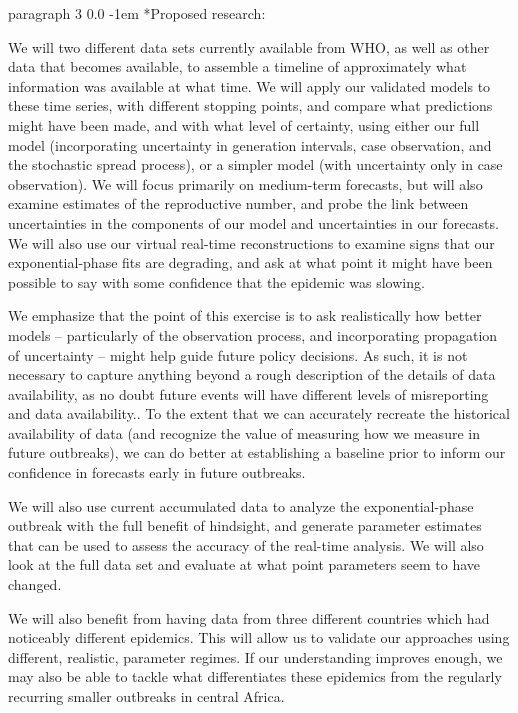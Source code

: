 \documentclass[12pt]{article}
\makeatletter
\renewcommand{\paragraph}{\vspace{0.40ex \@plus 0.2ex \@minus 0.0ex}\@startsection%
{paragraph}%
{3}%
{\parindent}%
{0.0\baselineskip}%
{-1em}%
{\normalfont\normalsize\bfseries}}%
\makeatother
\begin{document}
\paragraph*{Proposed research:}

We will two different data sets currently available from WHO, as well as other data that becomes available, to assemble a timeline of approximately what information was available at what time. We will apply our validated models to these time series, with different stopping points, and compare what predictions might have been made, and with what level of certainty, using either our full model (incorporating uncertainty in generation intervals, case observation, and the stochastic spread process), or a simpler model (with uncertainty only in case observation). We will focus primarily on medium-term forecasts, but will also examine estimates of the reproductive number, and probe the link between uncertainties in the components of our model and uncertainties in our forecasts. We will also use our virtual real-time reconstructions to examine signs that our exponential-phase fits are degrading, and ask at what point it might have been possible to say with some confidence that the epidemic was slowing.

We emphasize that the point of this exercise is to ask realistically how better models -- particularly of the observation process, and incorporating propagation of uncertainty -- might help guide future policy decisions.  As such, it is not  necessary to capture anything beyond a rough description of the details of data availability, as no doubt future events will have different levels of misreporting and data availability..  To the extent that we can accurately recreate the historical availability of data (and recognize the value of measuring how we measure in future outbreaks), we can do better at establishing a baseline prior to inform our confidence in forecasts early in future outbreaks.

We will also use current accumulated data to analyze the exponential-phase outbreak with the full benefit of hindsight, and generate parameter estimates that can be used to assess the accuracy of the real-time analysis. We will also look at the full data set and evaluate at what point parameters seem to have changed.

We will also benefit from having data from three different countries which had noticeably different epidemics. This will allow us to validate our approaches using different, realistic, parameter regimes.  If our understanding improves enough, we may also be able to tackle what differentiates these epidemics from the regularly recurring smaller outbreaks in central Africa.
\end{document}
